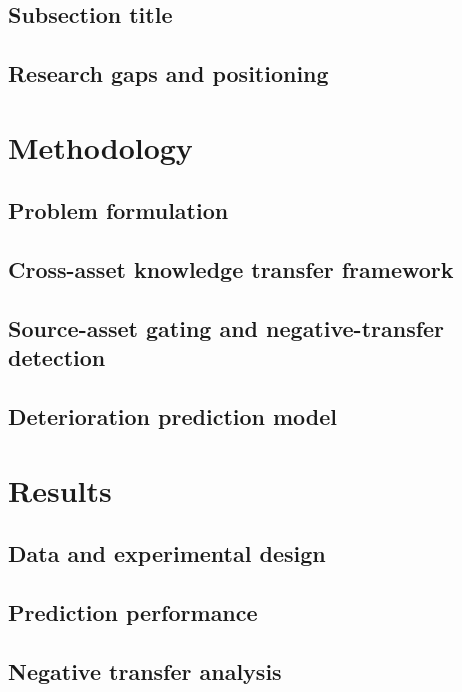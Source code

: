 \documentclass[authoryear,preprint,review,times,10pt]{elsarticle}
\begin{document}
\subsection{Subsection title}

\subsection{Research gaps and positioning}

\section{Methodology}
\subsection{Problem formulation}

\subsection{Cross-asset knowledge transfer framework}

\subsection{Source-asset gating and negative-transfer detection}

\subsection{Deterioration prediction model}

\section{Results}
\subsection{Data and experimental design}

\subsection{Prediction performance}

\subsection{Negative transfer analysis}
\end{document}

